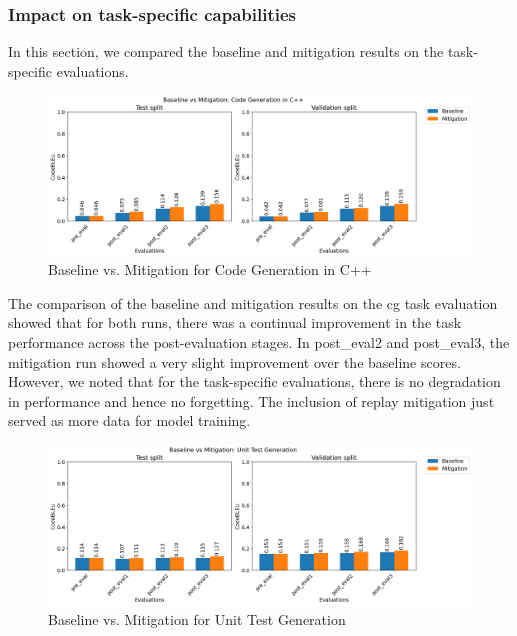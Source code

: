 \subsubsection{Impact on task-specific capabilities}
In this section, we compared the baseline and mitigation results on the task-specific evaluations.
\begin{figure}[H]
    \centering
    \includegraphics[width=1.2\textwidth]{Figures/results/code_comparisons/task_eval/comparison_task_cg.png} 
    \caption{Baseline vs. Mitigation for Code Generation in C++}
    \label{fig:CGComparison}
\end{figure}

The comparison of the baseline and mitigation results on the cg task evaluation showed that for both runs, there was a continual improvement in the task performance across the post-evaluation stages. In post\_eval2 and post\_eval3, the mitigation run showed a very slight improvement over the baseline scores. However, we noted that for the task-specific evaluations, there is no degradation in performance and hence no forgetting. The inclusion of replay mitigation just served as more data for model training.

\begin{figure}[H]
    \centering
    \includegraphics[width=1.2\textwidth]{Figures/results/code_comparisons/task_eval/comparison_task_utg.png} 
    \caption{Baseline vs. Mitigation for Unit Test Generation}
    \label{fig:UTGComparison}
\end{figure}

